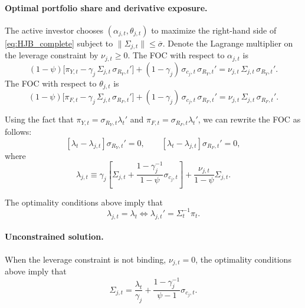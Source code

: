 \documentclass[11pt,english]{article}
\begin{document}
\paragraph{Optimal portfolio share and derivative exposure.} 
The active investor chooses $(\alpha_{j,t},\theta_{j,t})$ to maximize the right-hand side of \eqref{eq:HJB_complete} subject to $\|\Sigma_{j,t}\|\le\overline{\sigma}$. 
Denote the Lagrange multiplier on the leverage constraint by $\nu_{j,t}\ge 0$. The FOC with respect to $\alpha_{j,t}$ is
\begin{equation}\label{eq:FOC_alpha_complete}
    (1-\psi)\Big[\pi_{Y,t} - \gamma_j\,\Sigma_{j,t}\,\sigma_{R_Y,t}'\Big] + (1-\gamma_j)\,\sigma_{c_j,t}\,\sigma_{R_Y,t}' = \nu_{j,t}\,\Sigma_{j,t}\,\sigma_{R_Y,t}'.
\end{equation}
The FOC with respect to $\theta_{j,t}$ is
\begin{equation}\label{eq:FOC_theta_complete}
    (1-\psi)\Big[\pi_{F,t} - \gamma_j\,\Sigma_{j,t}\,\sigma_{R_F,t}'\Big] + (1-\gamma_j)\,\sigma_{c_j,t}\,\sigma_{R_F,t}' = \nu_{j,t}\,\Sigma_{j,t}\,\sigma_{R_F,t}'.
\end{equation}

Using the fact that $\pi_{Y,t} = \sigma_{R_Y,t} \lambda_t'$ and $\pi_{F,t} = \sigma_{R_F,t} \lambda_t'$, we can rewrite the FOC as follows:
\begin{equation}
	\left[ \lambda_t - \lambda_{j,t}  \right] \sigma_{R_Y,t}'  = 0, \qquad 
	\left[ \lambda_t - \lambda_{j,t}  \right] \sigma_{R_F,t}'  = 0,
\end{equation}
where
\begin{equation}
	\lambda_{j,t} \equiv \gamma_j \left[\Sigma_{j,t} + \frac{1 - \gamma_j^{-1}}{1-\psi} \sigma_{c_j,t}\right] + \frac{\nu_{j,t}}{1-\psi} \Sigma_{j,t}.
\end{equation}

The optimality conditions above imply that
\begin{equation}
    \lambda_{j,t} = \lambda_t \iff \lambda_{j,t}' = \Sigma_t^{-1} \pi_t.
\end{equation}

\paragraph{Unconstrained solution.} 
When the leverage constraint is not binding, $\nu_{j,t} = 0$, the optimality conditions above imply that
\begin{equation}
    \Sigma_{j,t} = \frac{\lambda_t}{\gamma_j} + \frac{1 - \gamma_j^{-1}}{\psi-1} \sigma_{c_j,t}.
\end{equation}
\end{document}
